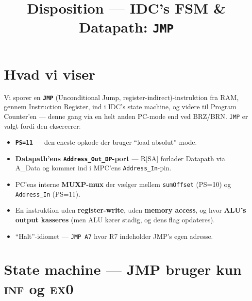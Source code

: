 \documentclass[11pt,a4paper]{article}
\title{\vspace{-1em}\textcolor{accent}{\Large Disposition --- IDC's FSM \& Datapath: \texttt{JMP}}}
\author{}
\date{}
\begin{document}
\maketitle
\vspace{-3em}

\section*{Hvad vi viser}

Vi sporer en \textbf{\texttt{JMP}} (Unconditional Jump, register-indirect)-instruktion
fra RAM, gennem Instruction Register, ind i IDC's state machine,
og videre til Program Counter'en --- denne gang via en helt anden PC-mode end ved BRZ/BRN.
\texttt{JMP} er valgt fordi den eksercerer:

\begin{itemize}
  \item \textbf{\texttt{PS=11}} --- den eneste opkode der bruger ``load absolut''-mode.
  \item \textbf{Datapath'ens \texttt{Address\_Out\_DP}-port} --- R[SA] forlader Datapath via A\_Data
        og kommer ind i MPC'ens \texttt{Address\_In}-pin.
  \item PC'ens interne \textbf{MUXP-mux} der vælger mellem \texttt{sumOffset} (PS=10) og \texttt{Address\_In} (PS=11).
  \item En instruktion uden \textbf{register-write}, uden \textbf{memory access}, og hvor \textbf{ALU's output kasseres}
        (men ALU kører stadig, og dens flag opdateres).
  \item ``Halt''-idiomet --- \texttt{JMP A7} hvor R7 indeholder JMP's egen adresse.
\end{itemize}

\section*{State machine --- JMP bruger kun \textsc{inf} og \textsc{ex0}}

\begin{center}
\end{center}
\end{document}
